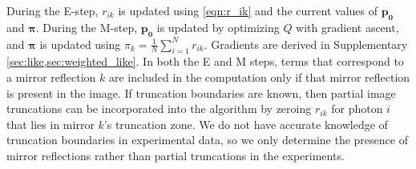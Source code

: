 During the E-step, $r_{ik}$ is updated using \cref{eqn:r_ik} and the current 
values of $\bm{p_0}$ and $\bm{\pi}$.
During the M-step, $\bm{p_0}$ is updated by optimizing 
$Q$ with gradient ascent, 
and $\bm{\pi}$ is updated using $\pi_k=\frac{1}{N}\sum_{i=1}^N r_{ik}$.
Gradients are derived in Supplementary \cref*{sec:like,sec:weighted_like}.
In both the E and M steps, terms that correspond to a mirror reflection $k$ are 
included in the computation only if that mirror reflection is present in the image.
If truncation boundaries are known, then partial image truncations 
can be incorporated into the algorithm by zeroing $r_{ik}$ for photon
$i$ that lies in mirror $k$'s truncation zone.
We do not have accurate knowledge of truncation boundaries in experimental data,
so we only determine the presence of mirror reflections rather than partial 
truncations in the experiments.

